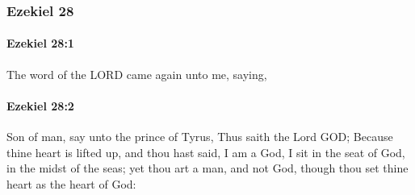 	\subsubsection{Ezekiel 28} %
		\label{EZEKIEL-28}

		\paragraph{Ezekiel 28:1} %
			\label{EZEKIEL-28-1}

			The word of the LORD came again unto me, saying,


		\paragraph{Ezekiel 28:2} %
			\label{EZEKIEL-28-2}

			Son of man, say unto the prince of Tyrus, Thus saith the Lord GOD; Because thine heart is lifted up, and thou hast said, I am a God, I sit in the seat of God, in the midst of the seas; yet thou art a man, and not God, though thou set thine heart as the heart of God:

